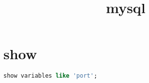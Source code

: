 \documentclass[12pt,twiside,a4paper]{book}
\numberwithin{chapter}{part}
\begin{document}
\author
{
}

\title{mysql}
\maketitle
\tableofcontents %
\newpage
\pagestyle{fancy}

\section{show}
\begin{lstlisting}[language=sql,breaklines = true]
show variables like 'port';
\end{lstlisting}
\end{document}

